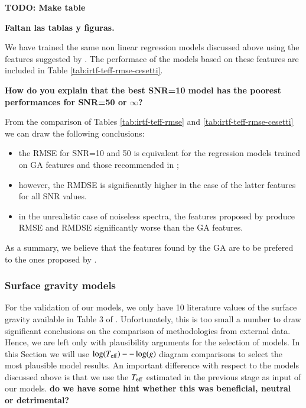 {\bf TODO: Make table}

{\bf Faltan las tablas y figuras.}


We have trained the same non linear regression models discussed above
using the features suggested by \cite{cesetti}. The performace of the
models based on these features are included in Table
\ref{tab:irtf-teff-rmse-cesetti}.

{\bf How do you explain that the best SNR=10 model has the poorest
  performances for SNR=50 or $\infty$?}

From the comparison of Tables \ref{tab:irtf-teff-rmse} and
\ref{tab:irtf-teff-rmse-cesetti} we can draw the following conclusions:

\begin{itemize}
\item the RMSE for SNR=10 and 50 is equivalent for the regression
  models trained on GA features and those recommended in
  \cite{cesetti};
  \item however, the RMDSE is significantly higher in the case of the
    latter features for all SNR values.
    \item in the unrealistic case of noiseless spectra, the features
      proposed by \cite{cesetti} produce RMSE and RMDSE significantly
      worse than the GA features.
\end{itemize}

As a summary, we believe that the features found by the GA are to be
prefered to the ones proposed by \cite{cesetti}.

\subsubsection{Surface gravity models}

For the validation of our models, we only have 10 literature values of
the surface gravity available in Table 3 of
\cite{cesetti}. Unfortunately, this is too small a number to draw
significant conclusions on the comparison of methodologies from
external data. Hence, we are left only with plausibility arguments for
the selection of models. In this Section we will use $\log(T_{\rm
  eff})--\log(g)$ diagram comparisons to select the most plausible
model results. An important difference with respect to the models
discussed above is that we use the $T_{\rm eff}$ estimated in the
previous stage as input of our models. {\bf do we have some hint
  whether this was beneficial, neutral or detrimental?}


